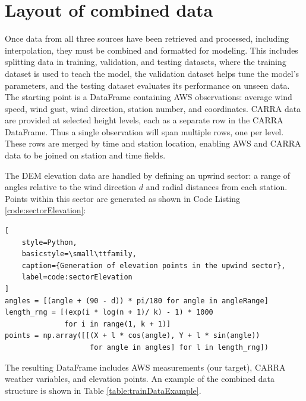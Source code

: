 \section{Layout of combined data}\label{sec:layout}

Once data from all three sources have been retrieved and processed, including interpolation, they must be combined and formatted for modeling. This includes splitting data in training, validation, and testing datasets, where the training dataset is used to teach the model, the validation dataset helps tune the model's parameters, and the testing dataset evaluates its performance on unseen data. The starting point is a DataFrame containing AWS observations: average wind speed, wind gust, wind direction, station number, and coordinates. CARRA data are provided at selected height levels, each as a separate row in the CARRA DataFrame. Thus a single observation will span multiple rows, one per level. These rows are merged by time and station location, enabling AWS and CARRA data to be joined on station and time fields.

The DEM elevation data are handled by defining an upwind sector: a range of angles relative to the wind direction $d$ and radial distances from each station. Points within this sector are generated as shown in Code Listing \ref{code:sectorElevation}:

\begin{lstlisting}[
    style=Python,
    basicstyle=\small\ttfamily,
    caption={Generation of elevation points in the upwind sector},
    label=code:sectorElevation
]
angles = [(angle + (90 - d)) * pi/180 for angle in angleRange]
length_rng = [(exp(i * log(n + 1)/ k) - 1) * 1000 
              for i in range(1, k + 1)]
points = np.array([[(X + l * cos(angle), Y + l * sin(angle))
                    for angle in angles] for l in length_rng])   
\end{lstlisting}

The resulting DataFrame includes AWS measurements (our target), CARRA weather variables, and elevation points. An example of the combined data structure is shown in Table \ref{table:trainDataExample}.

